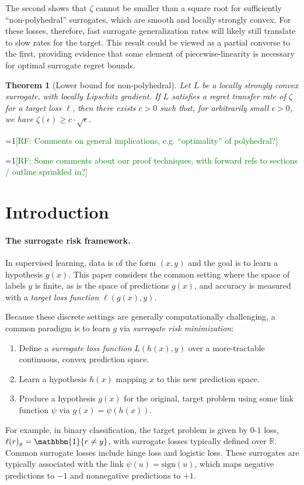 \documentclass{article}
\newtheorem{theorem}{Theorem}
\newcommand{\Comments}{1}
\newcommand{\mynote}[2]{\ifnum\Comments=1\textcolor{#1}{#2}\fi}
\newcommand{\raf}[1]{\mynote{green}{[RF: #1]}}
\newcommand{\reals}{\mathbb{R}}
\newcommand{\ones}{\mathbbm{1}}
\begin{document}
The second shows that $\zeta$ cannot be smaller than a square root for sufficiently ``non-polyhedral'' surrogates, which are smooth and locally strongly convex.
For these losses, therefore, fast surrogate generalization rates will likely still translate to slow rates for the target.
This result could be viewed as a partial converse to the first, providing evidence that some element of piecewise-linearity is necessary for optimal surrogate regret bounds.
\begin{theorem}[Lower bound for non-polyhedral]
  \label{thm:main-lower}
  Let $L$ be a locally strongly convex surrogate, with locally Lipschitz gradient.
  If $L$ satisfies a regret transfer rate of $\zeta$ for a target loss $\ell$, then there exists $c>0$ such that, for arbitrarily small $\epsilon>0$, we have $\zeta(\epsilon) \geq c\cdot\sqrt{\epsilon}$.
\end{theorem}
\raf{Comments on general implications, e.g. ``optimality'' of polyhedral?}

\raf{Some comments about our proof techniques, with forward refs to sections / outline sprinkled in?}

\section{Introduction}
\paragraph{The surrogate risk framework.}
In supervised learning, data is of the form $(x,y)$ and the goal is to learn a hypothesis $g(x)$.
This paper considers the common setting where the space of labels $y$ is finite, as is the space of predictions $g(x)$, and accuracy is measured with a \emph{target loss function} $\ell(g(x),y)$.

Because these discrete settings are generally computationally challenging, a common paradigm is to learn $g$ via \emph{surrogate risk minimization}:
\begin{enumerate}
  \item Define a \emph{surrogate loss function} $L(h(x),y)$ over a more-tractable continuous, convex prediction space.
  \item Learn a hypothesis $h(x)$ mapping $x$ to this new prediction space.
  \item Produce a hypothesis $g(x)$ for the original, target problem using some link function $\psi$ via $g(x) = \psi(h(x))$.
\end{enumerate}
For example, in binary classification, the target problem is given by $0$-$1$ loss, $\ell(r)_y = \ones\{r\neq y\}$, with surrogate losses typically defined over $\reals$.
Common surrogate losses include hinge loss and logistic loss.
These surrogates are typically associated with the link $\psi(u) = \mathrm{sign}(u)$, which maps negative predictions to $-1$ and nonnegative predictions to $+1$.
\end{document}
